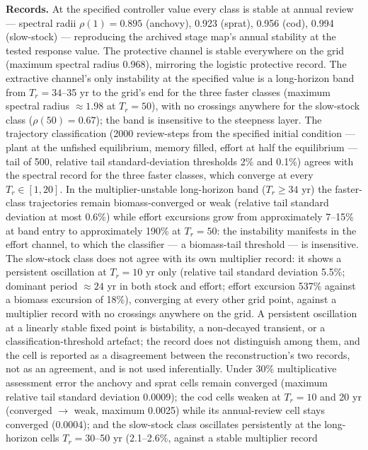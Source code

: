 \documentclass[11pt]{article}
\begin{document}
\textbf{Records.} At the specified controller value every class is stable
at annual review --- spectral radii \(\rho(1) = 0.895\) (anchovy), 0.923
(sprat), 0.956 (cod), 0.994 (slow-stock) --- reproducing the archived
stage map's annual stability at the tested response value. The
protective channel is stable everywhere on the grid (maximum spectral
radius 0.968), mirroring the logistic protective record. The extractive
channel's only instability at the specified value is a long-horizon band
from \(T_r = 34\)--35 yr to the grid's end for the three faster classes
(maximum spectral radius \(\approx 1.98\) at \(T_r = 50\)), with no
crossings anywhere for the slow-stock class (\(\rho(50) = 0.67\)); the
band is insensitive to the steepness layer. The trajectory
classification (2000 review-steps from the specified initial condition
--- plant at the unfished equilibrium, memory filled, effort at half the
equilibrium --- tail of 500, relative tail standard-deviation thresholds
2\% and 0.1\%) agrees with the spectral record for the three faster
classes, which converge at every \(T_r \in [1,20]\). In the multiplier-unstable long-horizon band (\(T_r \ge 34\) yr) the faster-class trajectories remain biomass-converged or weak (relative tail standard deviation at most 0.6\%) while effort excursions grow from approximately 7--15\% at band entry to approximately 190\% at \(T_r = 50\): the instability manifests in the effort channel, to which the classifier --- a biomass-tail threshold --- is insensitive. The slow-stock
class does not agree with its own multiplier record: it shows a
persistent oscillation at \(T_r = 10\) yr only (relative tail standard
deviation 5.5\%; dominant period \(\approx 24\) yr in both stock and
effort; effort excursion 537\% against a biomass excursion of 18\%),
converging at every other grid point, against a multiplier record with
no crossings anywhere on the grid. A persistent oscillation at a
linearly stable fixed point is bistability, a non-decayed transient, or
a classification-threshold artefact; the record does not distinguish
among them, and the cell is reported as a disagreement between the
reconstruction's two records, not as an agreement, and is not used inferentially. Under 30\%
multiplicative assessment error the anchovy and sprat cells remain
converged (maximum relative tail standard deviation 0.0009); the cod
cells weaken at \(T_r = 10\) and 20 yr (converged \(\to\) weak, maximum
0.0025) while its annual-review cell stays converged (0.0004); and the
slow-stock class oscillates persistently at the long-horizon cells
\(T_r = 30\)--50 yr (2.1--2.6\%, against a stable multiplier record
\end{document}
